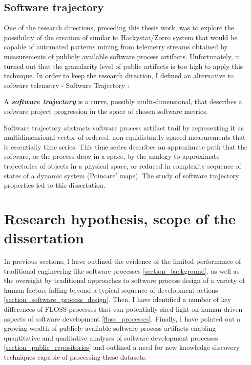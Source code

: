 \subsection{Software trajectory}
One of the research directions, preceding this thesis work, was to explore the possibility of the creation of similar to Hackystat/Zorro 
system that would be capable of automated patterns mining from telemetry streams obtained by measurements of publicly 
available software process artifacts. 
Unfortunately, it turned out that the granularity level of public artifacts is too high to apply this technique. 
In order to keep the research direction, I defined an alternative to software telemetry - Software Trajectory \cite{csdl2-10-09}:
\begin{defn}\label{def_trajectory}
A \textbf{\textit{software trajectory}} is a curve, possibly multi-dimensional, that describes a software project 
progression in the space of chosen software metrics.
\end{defn}
Software trajectory abstracts software process artifact trail by representing it as multidimensional vector of ordered, 
non-equidistantly spaced measurements that is essentially time series. This time series describes an approximate path that 
the software, or the process draw in a space, by the analogy to approximate trajectories of objects in a physical space, 
or reduced in complexity sequence of states of a dynamic system (Poincare' maps).
The study of software trajectory properties led to this dissertation.

%
%
\section{Research hypothesis, scope of the dissertation}\label{sec_research_hypothesis}
In previous sections, I have outlined the evidence of the limited performance of traditional engineering-like 
software processes \ref{section_background}, as well as the oversight by traditional approaches to software process 
design of a variety of human factors falling beyond a typical sequence of development actions 
\ref{section_software_process_design}.
Then, I have identified a number of key differences of FLOSS processes that can potentially shed light on 
human-driven aspects of software development \ref{floss_processes}.
Finally, I have pointed out a growing wealth of publicly available software process artifacts enabling quantitative 
and qualitative analyses of software development processes \ref{section_public_repositories} and outlined a need for 
new knowledge discovery techniques capable of processing these datasets.

